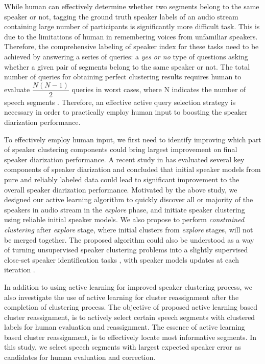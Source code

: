 \documentclass[journal,10pt]{IEEEtran}
\begin{document}
While human can effectively determine whether two segments belong to the same speaker or not, tagging the ground truth speaker labels of an audio stream containing large number of participants is significantly more difficult task. This is due to the limitations of human in remembering voices from unfamiliar speakers. Therefore, the comprehensive labeling of speaker index for these tasks need to be achieved by answering a series of queries: a \textit{yes or no} type of questions asking whether a given pair of segments belong to the same speaker or not. The total number of queries for obtaining perfect clustering results requires human to evaluate $\dfrac{N(N-1)}{2}$ queries in worst cases, where N indicates the number of speech segments \cite{shum2014limited}. Therefore, an effective active query selection strategy is necessary in order to practically employ human input to boosting the speaker diarization performance. 

To effectively employ human input, we first need to identify improving which part of speaker clustering components could bring largest improvement on final speaker diarization performance. A recent study in \cite{sinclair2013challenges} has evaluated several key components of speaker diarization and concluded that initial speaker models from pure and reliably labeled data could lead to significant improvement to the overall speaker diarization performance.  Motivated by the above study, we designed our active learning algorithm to quickly discover all or majority of the speakers in audio stream in the \textit{explore} phase, and initiate speaker clustering using reliable initial speaker models. We also propose to perform \textit{constrained clustering} after \textit{explore} stage, where initial clusters from \textit{explore} stages, will not be merged together. The proposed algorithm could also be understood as a way of turning unsupervised speaker clustering problems into a slightly supervised close-set speaker identification tasks \cite{zhu2005combining}, with speaker models updates at each iteration .

In addition to using active learning for improved speaker clustering process, we also investigate the use of active learning for cluster reassignment after the completion of clustering process. The objective of proposed active learning based cluster reassignment, is to actively select certain speech segments with clustered labels for human evaluation and reassignment. The essence of active learning based cluster reassignment, is to effectively locate most informative segments. In this study, we select speech segments with largest expected speaker error as candidates for human evaluation and correction.
\end{document}
